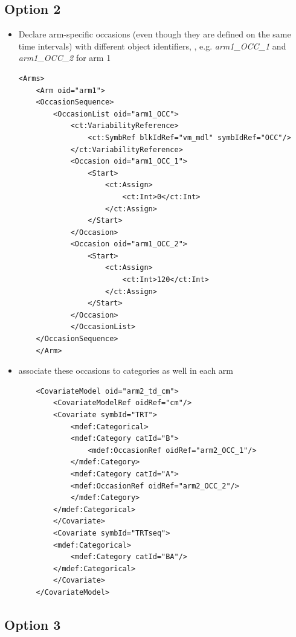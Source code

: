 \subsection{Option 2} 

\begin{itemize}
\item 
Declare arm-specific occasions (even though they are defined on the 
same time intervals) with different object identifiers, , 
e.g. \textit{arm1\_OCC\_1} and \textit{arm1\_OCC\_2} for arm 1 
\lstset{language=XML}
\begin{lstlisting}
<Arms>
    <Arm oid="arm1">
	<OccasionSequence>
	    <OccasionList oid="arm1_OCC">
	        <ct:VariabilityReference>
	            <ct:SymbRef blkIdRef="vm_mdl" symbIdRef="OCC"/>
	        </ct:VariabilityReference>
	        <Occasion oid="arm1_OCC_1">
	            <Start>
	                <ct:Assign>
	                    <ct:Int>0</ct:Int>
	                </ct:Assign>
	            </Start>
	        </Occasion>
	        <Occasion oid="arm1_OCC_2">
	            <Start>
	                <ct:Assign>
	                    <ct:Int>120</ct:Int>
	                </ct:Assign>
	            </Start>
	        </Occasion>
            </OccasionList>
	</OccasionSequence>
    </Arm>
\end{lstlisting}
\item
associate these occasions to categories as well in each arm
\lstset{language=XML}
\begin{lstlisting}
	<CovariateModel oid="arm2_td_cm">
	    <CovariateModelRef oidRef="cm"/>
	    <Covariate symbId="TRT">
	        <mdef:Categorical>
		    <mdef:Category catId="B">
		        <mdef:OccasionRef oidRef="arm2_OCC_1"/>
		    </mdef:Category>
		    <mdef:Category catId="A">
			<mdef:OccasionRef oidRef="arm2_OCC_2"/>
		    </mdef:Category>
		</mdef:Categorical>
	    </Covariate>
	    <Covariate symbId="TRTseq">
		<mdef:Categorical>
		    <mdef:Category catId="BA"/>
		</mdef:Categorical>
	    </Covariate>
	</CovariateModel>
\end{lstlisting}
\end{itemize}


\subsection{Option 3}

